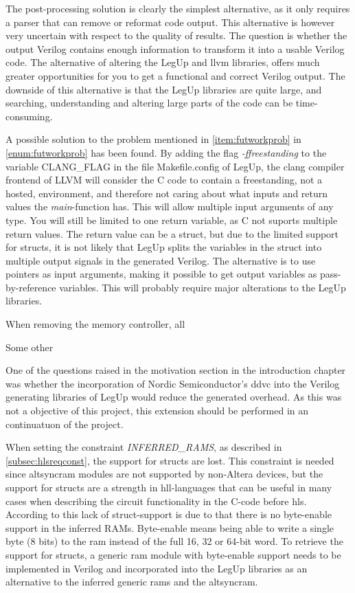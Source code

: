 The post-processing solution is clearly the simplest alternative, as it only requires a parser that can remove or reformat code output. This alternative is however very uncertain with respect to the quality of results. The question is whether the output Verilog contains enough information to transform it into a usable Verilog code.
The alternative of altering the LegUp and \gls{llvm} libraries, offers much greater opportunities for you to get a functional and correct Verilog output. The downside of this alternative is that the LegUp libraries are quite large, and searching, understanding and altering large parts of the code can be time-consuming. 

A possible solution to the problem mentioned in \cref{item:futworkprob} in \cref{enum:futworkprob} has been found. By adding the flag \textit{-ffreestanding} to the variable CLANG\_FLAG in the file Makefile.config of LegUp, the clang compiler frontend of LLVM will consider the C code to contain a freestanding, not a hosted, environment, and therefore not caring about what inputs and return values the \textit{main}-function has. This will allow multiple input arguments of any type. You will still be limited to one return variable, as C not suports multiple return values. The return value can be a struct, but due to the limited support for structs, it is not likely that LegUp splits the variables in the struct into multiple output signals in the generated Verilog. The alternative is to use pointers as input arguments, making it possible to get output variables as pass-by-reference variables. This will probably require major alterations to the LegUp libraries.   

When removing the memory controller, all 

Some other 



One of the questions raised in the motivation section in the introduction chapter was whether the incorporation of Nordic Semiconductor's \gls{ddvc} into the Verilog generating libraries of LegUp would reduce the generated overhead. As this was not a objective of this project, this extension should be performed in an continuatuon of the project.

When setting the constraint \textit{INFERRED\_RAMS}, as described in \cref{subsec:hlsreqconst}, the support for structs are lost. This constraint is needed since altsyncram modules are not supported by non-Altera devices, but the support for structs are a strength in \gls{hll}-languages that can be useful in many cases when describing the circuit functionality in the C-code before \gls{hls}. According to \cite{legupconst} this lack of struct-support is due to that there is no byte-enable support in the inferred RAMs. Byte-enable means being able to write a single byte (8 bits) to the \gls{ram} instead of the full 16, 32 or 64-bit word. To retrieve the support for structs, a generic \gls{ram} module with byte-enable support needs to be implemented in Verilog and incorporated into the LegUp libraries as an alternative to the inferred generic \gls{ram}s and the altsyncram. 